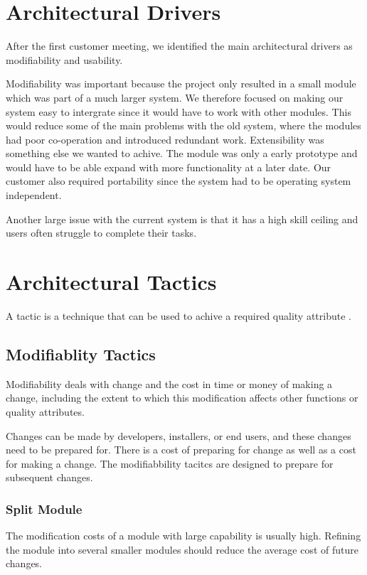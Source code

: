 \documentclass{report}
\begin{document}
\section{Architectural Drivers} \label{sec:architectural_drivers}
After the first customer meeting, we identified the main architectural drivers as modifiability and usability.

Modifiability was important because the project only resulted in a small module which was part of a much larger system. We therefore focused on making our system easy to intergrate since it would have to work with other modules. This would reduce some of the main problems with the old system, where the modules had poor co-operation and introduced redundant work. Extensibility was something else we wanted to achive. The module was only a early prototype and would have to be able expand with more functionality at a later date. Our customer also required portability since the system had to be operating system independent.

Another large issue with the current system is that it has a high skill ceiling and users often struggle to complete their tasks.



\section{Architectural Tactics} \label{sec:architectural_tactics}
A tactic is a technique that can be used to achive a required quality attribute \cite[page 70]{book:bass}.

\subsection{Modifiablity Tactics} 
Modifiability deals with change and the cost in time or money of making a change, including the extent to which this modification affects other functions or quality attributes.

Changes can be made by developers, installers, or end users, and these changes need to be prepared for. There is a cost of preparing for change as well as a cost for making a change. The modifiabbility tacitcs are designed to prepare for subsequent changes.\cite[page 128]{book:bass}

\subsubsection{Split Module}
The modification costs of a module with large capability is usually high. Refining the module into several smaller modules should reduce the average cost of future changes.
\end{document}
